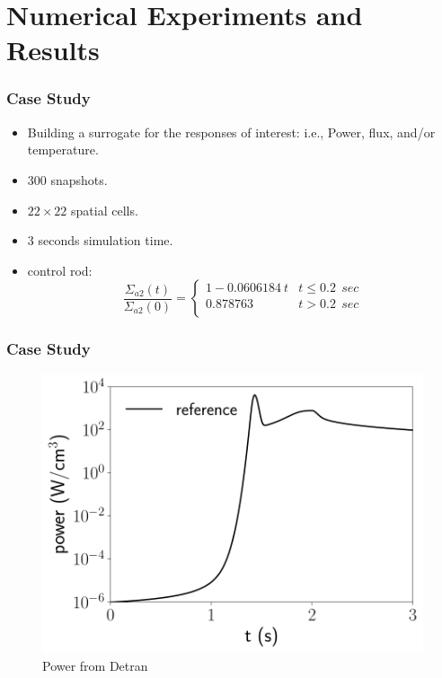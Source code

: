 \documentclass[fleqn]{beamer}
\begin{document}
\section{Numerical Experiments and Results}
\begin{frame}
\frametitle{Case Study}
\begin{itemize}
\item Building a surrogate for the responses of interest: i.e., Power, flux, and/or temperature.

\item 300 snapshots.
\item $22 \times 22$ spatial cells.
\item 3 seconds simulation time.
\item control rod:
\begin{equation*}
    \frac{\Sigma_{a2}(t)}{\Sigma_{a2}(0)}=\left\{
\begin{array}{ll}
1-0.0606184 \ t & t\le 0.2 \ \ sec\\
0.878763 & t>0.2 \ \ sec\\
\end{array} \right. 
\end{equation*}

\end{itemize}
\end{frame}

\begin{frame}
\frametitle{Case Study}
\begin{figure}[ht]
\includegraphics[scale=0.5]{HF_Power.pdf}
\caption{Power from Detran}
\end{figure}
\end{frame}
\end{document}
